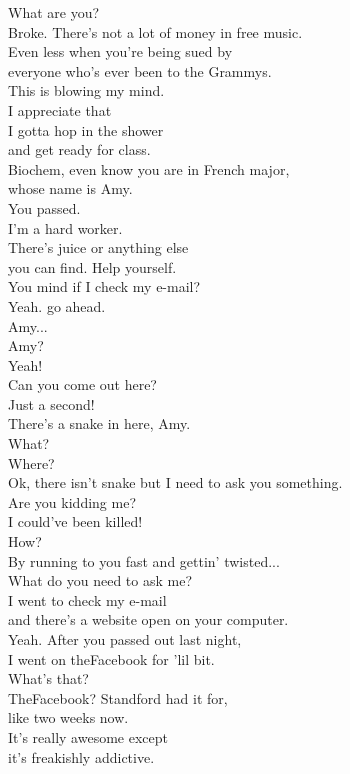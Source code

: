 \documentclass{article}
\begin{document}
\begin{multicols}{3}
What are you?\\
Broke. There's not a lot of money in free music.\\
Even less when you're being sued by\\
everyone who's ever been to the Grammys.\\
This is blowing my mind.\\
I appreciate that\\
I gotta hop in the shower\\
and get ready for class.\\
Biochem, even know you are in French major,\\
whose name is Amy.\\
You passed.\\
I'm a hard worker.\\
There's juice or anything else\\
you can find. Help yourself.\\
You mind if I check my e-mail?\\
Yeah. go ahead.\\
Amy...\\
Amy?\\
Yeah!\\
Can you come out here?\\
Just a second!\\
There's a snake in here, Amy.\\
What?\\
Where?\\
Ok, there isn't snake but I need to ask you something.\\
Are you kidding me?\\
I could've been killed!\\
How?\\
By running to you fast and gettin' twisted...\\
What do you need to ask me?\\
I went to check my e-mail\\
and there's a website open on your computer.\\
Yeah. After you passed out last night,\\
I went on theFacebook for 'lil bit.\\
What's that?\\
TheFacebook? Standford had it for,\\
like two weeks now.\\
It's really awesome except\\
it's freakishly addictive.\\

\end{multicols}
\end{document}
